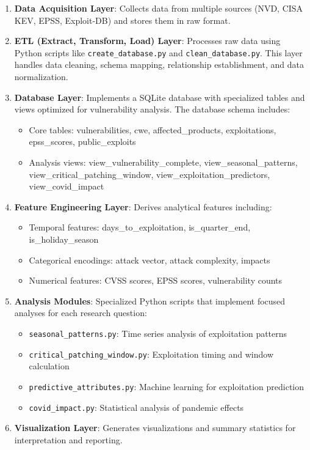 \documentclass[runningheads]{llncs}
\begin{document}
\begin{enumerate}
    \item \textbf{Data Acquisition Layer}: Collects data from multiple sources (NVD, CISA KEV, EPSS, Exploit-DB) and stores them in raw format.
    
    \item \textbf{ETL (Extract, Transform, Load) Layer}: Processes raw data using Python scripts like \texttt{create\_database.py} and \texttt{clean\_database.py}. This layer handles data cleaning, schema mapping, relationship establishment, and data normalization.
    
    \item \textbf{Database Layer}: Implements a SQLite database with specialized tables and views optimized for vulnerability analysis. The database schema includes:
    \begin{itemize}
        \item Core tables: vulnerabilities, cwe, affected\_products, exploitations, epss\_scores, public\_exploits
        \item Analysis views: view\_vulnerability\_complete, view\_seasonal\_patterns, view\_critical\_patching\_window, view\_exploitation\_predictors, view\_covid\_impact
    \end{itemize}
    
    \item \textbf{Feature Engineering Layer}: Derives analytical features including:
    \begin{itemize}
        \item Temporal features: days\_to\_exploitation, is\_quarter\_end, is\_holiday\_season
        \item Categorical encodings: attack vector, attack complexity, impacts
        \item Numerical features: CVSS scores, EPSS scores, vulnerability counts
    \end{itemize}
    
    \item \textbf{Analysis Modules}: Specialized Python scripts that implement focused analyses for each research question:
    \begin{itemize}
        \item \texttt{seasonal\_patterns.py}: Time series analysis of exploitation patterns
        \item \texttt{critical\_patching\_window.py}: Exploitation timing and window calculation
        \item \texttt{predictive\_attributes.py}: Machine learning for exploitation prediction
        \item \texttt{covid\_impact.py}: Statistical analysis of pandemic effects
    \end{itemize}
    
    \item \textbf{Visualization Layer}: Generates visualizations and summary statistics for interpretation and reporting.
\end{enumerate}
\end{document}
